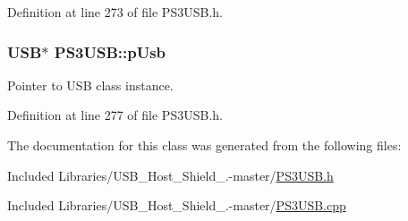 \-Definition at line 273 of file \-P\-S3\-U\-S\-B.\-h.

\hypertarget{class_p_s3_u_s_b_aa1873f41ae0da7c4568cfb7517560c48}{
\subsubsection[{p\-Usb}]{\setlength{\rightskip}{0pt plus 5cm}\-U\-S\-B$\ast$ {\bf \-P\-S3\-U\-S\-B\-::p\-Usb}}}\label{class_p_s3_u_s_b_aa1873f41ae0da7c4568cfb7517560c48}
\-Pointer to \-U\-S\-B class instance. 

\-Definition at line 277 of file \-P\-S3\-U\-S\-B.\-h.



\-The documentation for this class was generated from the following files\-:\begin{DoxyCompactItemize}
\item 
\-Included Libraries/\-U\-S\-B\-\_\-\-Host\-\_\-\-Shield\-\_.-\/master/\hyperlink{_p_s3_u_s_b_8h}{\-P\-S3\-U\-S\-B.\-h}\item 
\-Included Libraries/\-U\-S\-B\-\_\-\-Host\-\_\-\-Shield\-\_.-\/master/\hyperlink{_p_s3_u_s_b_8cpp}{\-P\-S3\-U\-S\-B.\-cpp}\end{DoxyCompactItemize}
